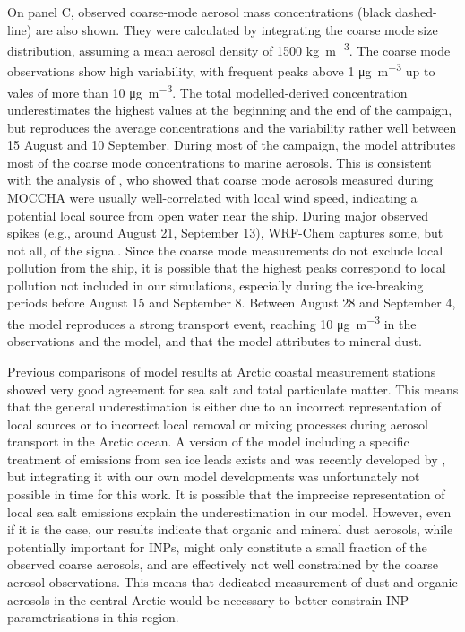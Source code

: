     
        On panel C, observed coarse-mode aerosol mass concentrations (black dashed-line) are also shown. They were calculated by integrating the coarse mode size distribution, assuming a mean aerosol density of 1500  \si{\kg\per\cubic\metre}. The coarse mode observations show high variability, with frequent peaks above 1 \si{\ug\per\cubic\metre} up to vales of more than 10  \si{\ug\per\cubic\metre}.
        The total modelled-derived concentration underestimates the highest values  at the beginning and the end of the campaign, but reproduces the average concentrations and the variability rather well between 15 August and 10 September. During most of the campaign, the model attributes most of the coarse mode concentrations to marine aerosols. This is consistent with the analysis of \citet{kojoj_arctic_2024}, who showed that coarse mode aerosols measured during MOCCHA were usually well-correlated with local wind speed, indicating a potential local source from open water near the ship.
        During major observed spikes (e.g., around August 21, September 13), WRF-Chem captures some, but not all, of the signal. Since the coarse mode measurements do not exclude local pollution from the ship, it is possible that the highest peaks correspond to local pollution not included in our simulations, especially during the ice-breaking periods before August 15 and September 8. Between August 28 and September 4, the model reproduces a strong transport event, reaching 10  \si{\ug\per\cubic\metre} in the observations and the model, and that the model attributes to mineral dust.

        Previous comparisons of model results at Arctic coastal measurement stations showed very good agreement for sea salt and total particulate matter. This means that the general underestimation is either due to an incorrect representation of local sources or to incorrect local removal or mixing processes during aerosol transport in the Arctic ocean. A version of the model including a specific treatment of emissions from sea ice leads exists and was recently developed by \citet{lapere_modeling_2024}, but integrating it with our own model developments was unfortunately not possible in time for this work. It is possible that the imprecise representation of local sea salt emissions explain the underestimation in our model. However, even if it is the case, our results indicate that organic and mineral dust aerosols, while potentially important for INPs, might only constitute a small fraction of the observed coarse aerosols, and are effectively not well constrained by the coarse aerosol observations. This means that dedicated measurement of dust and organic aerosols in the central Arctic would be necessary to better constrain INP parametrisations in this region.
        

